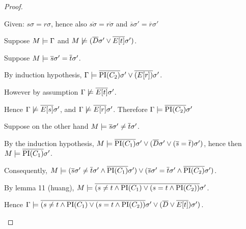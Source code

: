 \begin{proof}
\begin{description}
			Given: $s\sigma = r\sigma$, hence also $\overline{s\sigma} = \overline{r\sigma}$ and $\overline{s}\sigma' = \overline{r}\sigma'$

			Suppose $M \models \Gamma$ and $M \not \models (\overline{D}\sigma' \lor \overline{E[t]}\sigma') $.

			Suppose $M \models \overline{s}\sigma' = \overline{t}\sigma'$.

			By induction hypothesis, 
			$\Gamma \models \overline{\mathrm{PI}(C_2)}\sigma' \lor \overline{(E[r])}\sigma'$.

		However by assumption $\Gamma \not \models \overline{E[t]}\sigma'$.

		Hence $\Gamma \not \models \overline{E[s]}\sigma'$, and
		$\Gamma \not \models \overline{E[r]}\sigma'$. Therefore $\Gamma \models \overline{\mathrm{PI}(C_2)}\sigma'$


		Suppose on the other hand $M \models \overline{s}\sigma' \neq \overline{t}\sigma'$.

		By the induction hypothesis, 
		$M \models \overline{\mathrm{PI}(C_1)}\sigma' \lor (\overline{D}\sigma'\lor (\overline{s}=\overline{t})\sigma')$,
		hence then $M \models \overline{\mathrm{PI}(C_1)}\sigma'$.

		Consequently, 
		$M \models (\overline{s}\sigma' \neq \overline{t}\sigma' \land \overline{\mathrm{PI}(C_1)}\sigma') \lor (\overline{s}\sigma' = \overline{t}\sigma' \land \overline{\mathrm{PI}(C_2)}\sigma')$.

		By lemma 11 (huang), 
		$M \models \overline{(s \neq {t} \land {\ensuremath{\mathrm{PI}}(C_1)} \lor ({s} = {t} \land \mathrm{PI}(C_2))}\sigma'$.

		Hence 
		$\Gamma \models \overline{(s \neq {t} \land {\ensuremath{\mathrm{PI}}(C_1)} \lor ({s} = {t} \land \mathrm{PI}(C_2))}\sigma' \lor (\overline{D} \lor \overline{E[t]})\sigma') $.


\end{description}
\end{proof}







